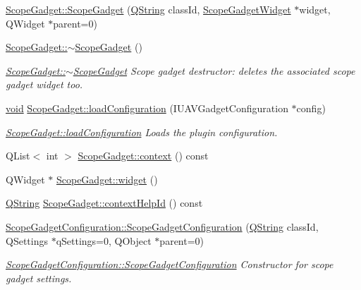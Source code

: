 \begin{DoxyCompactItemize}
\hyperlink{group___scope_plugin_ga3f75e488a9369b654162e789b9f7d4c8}{\-Scope\-Gadget\-::\-Scope\-Gadget} (\hyperlink{group___u_a_v_objects_plugin_gab9d252f49c333c94a72f97ce3105a32d}{\-Q\-String} class\-Id, \hyperlink{class_scope_gadget_widget}{\-Scope\-Gadget\-Widget} $\ast$widget, \-Q\-Widget $\ast$parent=0)
\item 
\hyperlink{group___scope_plugin_ga814c8fd9020778e2cb89a7ab8a49995b}{\-Scope\-Gadget\-::$\sim$\-Scope\-Gadget} ()
\begin{DoxyCompactList}\small\item\em \hyperlink{group___scope_plugin_ga814c8fd9020778e2cb89a7ab8a49995b}{\-Scope\-Gadget\-::$\sim$\-Scope\-Gadget} \-Scope gadget destructor\-: deletes the associated scope gadget widget too. \end{DoxyCompactList}\item 
\hyperlink{group___u_a_v_objects_plugin_ga444cf2ff3f0ecbe028adce838d373f5c}{void} \hyperlink{group___scope_plugin_ga34947ab35d8b4d37de1a1d70e32e2de5}{\-Scope\-Gadget\-::load\-Configuration} (\-I\-U\-A\-V\-Gadget\-Configuration $\ast$config)
\begin{DoxyCompactList}\small\item\em \hyperlink{group___scope_plugin_ga34947ab35d8b4d37de1a1d70e32e2de5}{\-Scope\-Gadget\-::load\-Configuration} \-Loads the plugin configuration. \end{DoxyCompactList}\item 
\-Q\-List$<$ int $>$ \hyperlink{group___scope_plugin_gad13cd805d94869e729a8eb14728e2551}{\-Scope\-Gadget\-::context} () const 
\item 
\-Q\-Widget $\ast$ \hyperlink{group___scope_plugin_ga64f4c7f063a7d85c79728a770d411cb2}{\-Scope\-Gadget\-::widget} ()
\item 
\hyperlink{group___u_a_v_objects_plugin_gab9d252f49c333c94a72f97ce3105a32d}{\-Q\-String} \hyperlink{group___scope_plugin_gad4bf2378223ce3ef188714a3ce9d9fb3}{\-Scope\-Gadget\-::context\-Help\-Id} () const 
\item 
\hyperlink{group___scope_plugin_ga08c3c3b7c00b5fca9d78f97f6ae66381}{\-Scope\-Gadget\-Configuration\-::\-Scope\-Gadget\-Configuration} (\hyperlink{group___u_a_v_objects_plugin_gab9d252f49c333c94a72f97ce3105a32d}{\-Q\-String} class\-Id, \-Q\-Settings $\ast$q\-Settings=0, \-Q\-Object $\ast$parent=0)
\begin{DoxyCompactList}\small\item\em \hyperlink{group___scope_plugin_ga08c3c3b7c00b5fca9d78f97f6ae66381}{\-Scope\-Gadget\-Configuration\-::\-Scope\-Gadget\-Configuration} \-Constructor for scope gadget settings. \end{DoxyCompactList}\item 

\end{DoxyCompactItemize}
